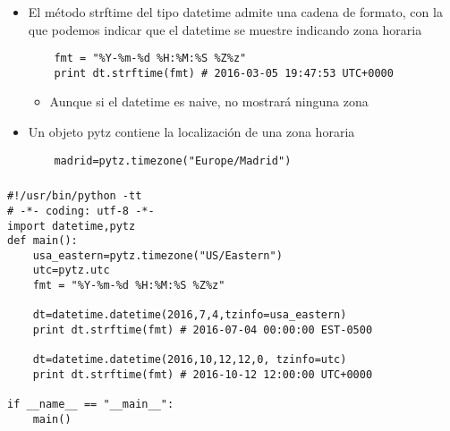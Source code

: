 \documentclass[ucs]{beamer}
\begin{document}
\begin{frame}[fragile]
\frametitle{}
\begin{itemize}
\item
El método strftime del tipo datetime admite una cadena de formato, con
la que podemos indicar que el datetime se muestre indicando zona horaria

  \begin{footnotesize}
  \begin{verbatim}
    fmt = "%Y-%m-%d %H:%M:%S %Z%z"
    print dt.strftime(fmt) # 2016-03-05 19:47:53 UTC+0000
  \end{verbatim}
  \end{footnotesize}


\begin{itemize}
\item
Aunque si el datetime es naive, no mostrará ninguna zona 
\end{itemize}

\item
Un objeto pytz contiene la localización de una zona horaria

  \begin{footnotesize}
  \begin{verbatim}
    madrid=pytz.timezone("Europe/Madrid")
  \end{verbatim}
  \end{footnotesize}


\end{itemize}
\end{frame}


\begin{frame}[fragile]
\frametitle{}

  \begin{footnotesize}
  \begin{verbatim}
#!/usr/bin/python -tt
# -*- coding: utf-8 -*-
import datetime,pytz
def main():
    usa_eastern=pytz.timezone("US/Eastern")
    utc=pytz.utc
    fmt = "%Y-%m-%d %H:%M:%S %Z%z"
 
    dt=datetime.datetime(2016,7,4,tzinfo=usa_eastern)
    print dt.strftime(fmt) # 2016-07-04 00:00:00 EST-0500

    dt=datetime.datetime(2016,10,12,12,0, tzinfo=utc)
    print dt.strftime(fmt) # 2016-10-12 12:00:00 UTC+0000
  
if __name__ == "__main__":
    main()
  \end{verbatim}
  \end{footnotesize}

\end{frame}
\end{document}
